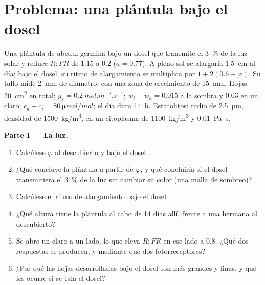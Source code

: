 \section{Problema: una plántula bajo el dosel}

\begin{problem}
\label{pb:b2:plant-plasticity:1}
Una plántula de abedul germina bajo un dosel que transmite el
\qty{3}{\%} de la luz solar y reduce $R{:}FR$ de $1.15$ a $0.2$
($a = 0.77$). A pleno sol se alargaría \qty{1.5}{cm} al día; bajo el dosel,
su ritmo de alargamiento se multiplica por $1 +
2(0.6 - \varphi)$. Su tallo mide \qty{2}{mm} de diámetro, con una zona de
crecimiento de \qty{15}{mm}. Hojas: \qty{20}{cm^2} en total; $g_s =
\qty{0.2}{mol.m^{-2}.s^{-1}}$; $w_i - w_a = 0.015$ a la sombra y
$0.03$ en un claro; $c_a - c_i = \qty{80}{\micro mol/mol}$; el día dura
\qty{14}{h}. Estatolitos: radio de \qty{2.5}{\micro m}, densidad de
\qty{1500}{kg/m^3}, en un citoplasma de \qty{1100}{kg/m^3} y
\qty{0.01}{Pa.s}.

\medskip
\noindent\textbf{Parte I --- La luz.}
\begin{enumerate}
  \item Calcúlese $\varphi$ al descubierto y bajo el dosel.
  \item ¿Qué concluye la plántula a partir de $\varphi$, y qué concluiría
        si el dosel transmitiera el \qty{3}{\%} de la luz sin cambiar su
        color (una malla de sombreo)?
  \item Calcúlese el ritmo de alargamiento bajo el dosel.
  \item ¿Qué altura tiene la plántula al cabo de 14 días allí, frente a una
        hermana al descubierto?
  \item Se abre un claro a un lado, lo que eleva $R{:}FR$ en ese lado a
        $0.8$. ¿Qué dos respuestas se producen, y mediante qué dos
        fotorreceptores?
  \item ¿Por qué las hojas desarrolladas bajo el dosel son más grandes y
        finas, y qué les ocurre si se tala el dosel?
\end{enumerate}


\end{problem}
